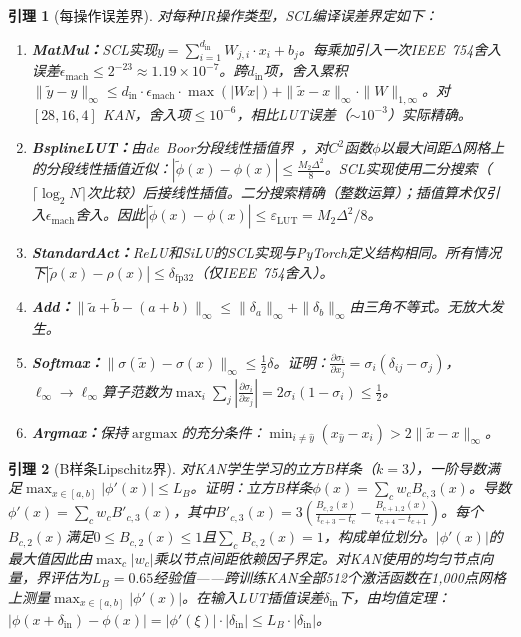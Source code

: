 \documentclass[journal,onecolumn]{IEEEtran}
\theoremstyle{definition}
\theoremstyle{plain}
\newtheorem{lemma}{引理}
\theoremstyle{remark}
\begin{document}
\begin{lemma}[每操作误差界]
\label{lem:per_op}
对每种IR操作类型，SCL编译误差界定如下：
\begin{enumerate}
    \item \textbf{MatMul：}SCL实现$y = \sum_{i=1}^{d_{\text{in}}} W_{j,i} \cdot x_i + b_j$。每乘加引入一次IEEE~754舍入误差$\epsilon_{\text{mach}} \leq 2^{-23} \approx 1.19 \times 10^{-7}$。跨$d_{\text{in}}$项，舍入累积$\|\tilde{y} - y\|_\infty \leq d_{\text{in}} \cdot \epsilon_{\text{mach}} \cdot \max(|Wx|) + \|\tilde{x} - x\|_\infty \cdot \|W\|_{1,\infty}$。对$[28,16,4]$ KAN，舍入项$\leq 10^{-6}$，相比LUT误差（$\sim 10^{-3}$）实际精确。
    \item \textbf{BsplineLUT：}由de~Boor分段线性插值界~\cite{deBoor1978}，对$C^2$函数$\phi$以最大间距$\Delta$网格上的分段线性插值近似：$|\tilde{\phi}(x) - \phi(x)| \leq \frac{M_2 \Delta^2}{8}$。SCL实现使用二分搜索（$\lceil \log_2 N \rceil$次比较）后接线性插值。二分搜索精确（整数运算）；插值算术仅引入$\epsilon_{\text{mach}}$舍入。因此$|\tilde{\phi}(x) - \phi(x)| \leq \varepsilon_{\text{LUT}} = M_2 \Delta^2 / 8$。
    \item \textbf{StandardAct：}ReLU和SiLU的SCL实现与PyTorch定义结构相同。所有情况下$|\tilde{\rho}(x) - \rho(x)| \leq \delta_{\text{fp32}}$（仅IEEE~754舍入）。
    \item \textbf{Add：}$\|\tilde{a}+\tilde{b} - (a+b)\|_\infty \leq \|\delta_a\|_\infty + \|\delta_b\|_\infty$由三角不等式。无放大发生。
    \item \textbf{Softmax：}$\|\sigma(\tilde{x}) - \sigma(x)\|_\infty \leq \frac{1}{2}\delta$。证明：$\frac{\partial \sigma_i}{\partial x_j} = \sigma_i(\delta_{ij} - \sigma_j)$，$\ell_\infty \to \ell_\infty$算子范数为$\max_i \sum_j |\frac{\partial \sigma_i}{\partial x_j}| = 2\sigma_i(1-\sigma_i) \leq \frac{1}{2}$。
    \item \textbf{Argmax：}保持$\operatorname{argmax}$的充分条件：$\min_{i \neq \hat{y}} (x_{\hat{y}} - x_i) > 2\|\tilde{x} - x\|_\infty$。
\end{enumerate}
\end{lemma}

\begin{lemma}[B样条Lipschitz界]
\label{lem:bspline_lipschitz}
对KAN学生学习的立方B样条（$k=3$），一阶导数满足$\max_{x \in [a,b]} |\phi'(x)| \leq L_B$。证明：立方B样条$\phi(x) = \sum_c w_c B_{c,3}(x)$。导数$\phi'(x) = \sum_c w_c B'_{c,3}(x)$，其中$B'_{c,3}(x) = 3(\frac{B_{c,2}(x)}{t_{c+3}-t_c} - \frac{B_{c+1,2}(x)}{t_{c+4}-t_{c+1}})$。每个$B_{c,2}(x)$满足$0 \leq B_{c,2}(x) \leq 1$且$\sum_c B_{c,2}(x) = 1$，构成单位划分。$|\phi'(x)|$的最大值因此由$\max_c |w_c|$乘以节点间距依赖因子界定。对KAN使用的均匀节点向量，界评估为$L_B = 0.65$经验值——跨训练KAN全部512个激活函数在1,000点网格上测量$\max_{x \in [a,b]} |\phi'(x)|$。在输入LUT插值误差$\delta_{\text{in}}$下，由均值定理：$|\phi(x+\delta_{\text{in}}) - \phi(x)| = |\phi'(\xi)| \cdot |\delta_{\text{in}}| \leq L_B \cdot |\delta_{\text{in}}|$。
\end{lemma}
\end{document}
